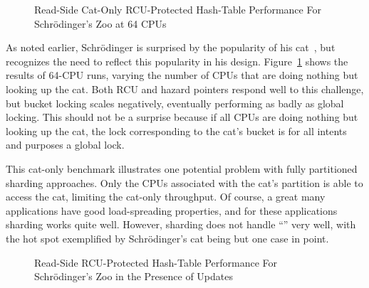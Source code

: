 \begin{figure}
\centering
{}
\caption{Read-Side Cat-Only RCU-Protected Hash-Table Performance For Schr\"odinger's Zoo at 64 CPUs}
\label{fig:datastruct:Read-Side Cat-Only RCU-Protected Hash-Table Performance For Schroedinger's Zoo at 64 CPUs}
\end{figure}

As noted earlier, Schr\"odinger is surprised by the popularity of his
cat~\cite{ErwinSchroedinger1935Cat}, but recognizes the need to reflect
this popularity in his design.
Figure~\ref{fig:datastruct:Read-Side Cat-Only RCU-Protected Hash-Table Performance For Schroedinger's Zoo at 64 CPUs}
shows the results of 64-CPU runs, varying the number of CPUs that are
doing nothing but looking up the cat.
Both RCU and hazard pointers respond well to this challenge, but bucket
locking scales negatively, eventually performing as badly as global
locking.
This should not be a surprise because if all CPUs are doing nothing
but looking up the cat, the lock corresponding to the cat's bucket
is for all intents and purposes a global lock.

This cat-only benchmark illustrates one potential problem with
fully partitioned sharding approaches.
Only the CPUs associated with the cat's
partition is able to access the cat, limiting the cat-only
throughput.
Of course, a great many applications have good load-spreading
properties, and for these applications sharding works
quite well.
However, sharding does not handle ``'' very well, with
the hot spot exemplified by Schr\"odinger's cat being but one case
in point.

\begin{figure}
\centering
{}
\caption{Read-Side RCU-Protected Hash-Table Performance For Schr\"odinger's Zoo in the Presence of Updates}
\label{fig:datastruct:Read-Side RCU-Protected Hash-Table Performance For Schroedinger's Zoo in the Presence of Updates}
\end{figure}

